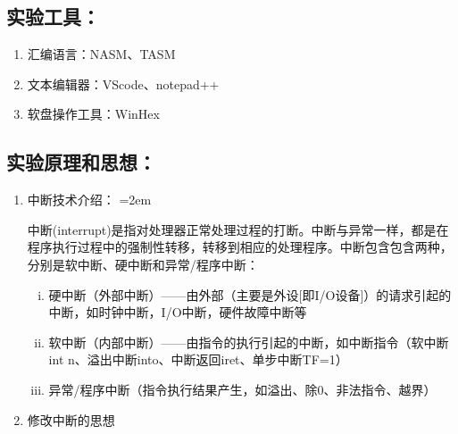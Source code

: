 \documentclass[UTF8]{article}
\begin{document}
\subsection{实验工具：}
\begin{enumerate}[1)]%
\heiti\setlength{\itemsep}{0em}
	\item 汇编语言：NASM、TASM
	\item 文本编辑器：VScode、notepad++
	\item 软盘操作工具：WinHex
\end{enumerate}

\subsection{实验原理和思想：}
\begin{enumerate}[1)]
\heiti
	\item 中断技术介绍：
	\parindent=2em
	\par 中断(interrupt)是指对处理器正常处理过程的打断。中断与异常一样，都是在程序执行过程中的强制性转移，转移到相应的处理程序。中断包含包含两种，分别是软中断、硬中断和异常/程序中断：	
		\begin{enumerate}[i)]
		\heiti \setlength{\itemsep}{0.2ex}
			\item 硬中断（外部中断）——由外部（主要是外设[即I/O设备]）的请求引起的中断，如时钟中断，I/O中断，硬件故障中断等
			\item 软中断（内部中断）——由指令的执行引起的中断，如中断指令（软中断int n、溢出中断into、中断返回iret、单步中断TF=1）
			\item 异常/程序中断（指令执行结果产生，如溢出、除0、非法指令、越界）
		\end{enumerate}
		
	\item 修改中断的思想
		\begin{enumerate}[i)]
		\heiti \setlength{\itemsep}{0.2ex}
		

\end{enumerate}
\end{enumerate}
\end{document}
